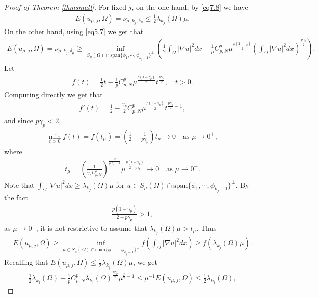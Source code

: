 \documentclass[10pt,a4paper]{amsart}
\newcommand{\ga}{\gamma}
\newcommand{\la}{\lambda}
\begin{document}
\begin{proof}[Proof of Theorem \ref{thmsmall}]
For fixed $j$, on the one hand, by \eqref{eq7.8} we have
\begin{align*}
	E(u_{\mu,j},\Omega) = \nu_{\mu,k_j,\delta_\mu} \le \frac12\la_{k_j}(\Omega) \mu.
\end{align*}
On the other hand, using \eqref{eq5.7} we get that
\begin{align*}
	E(u_{\mu,j},\Omega) = \nu_{\mu,k_j,\delta_\mu} \geq \inf_{S_\mu(\Omega) \cap \text{span}\{\phi_1,\cdots,\phi_{k_j-1}\}^{\bot}}\left( \frac12 \int_\Omega |\nabla u|^2dx - \frac1p C_{p,N}^p \mu^{\frac{p(1-\ga_p)}{2}}\left( \int_\Omega |\nabla u|^2dx\right) ^{\frac{p\ga_p}{2}} \right).
\end{align*}
Let
\begin{align*}
	f(t) = \frac12 t - \frac1p C_{p,N}^p \mu^{\frac{p(1-\ga_p)}{2}}t ^{\frac{p\ga_p}{2}}, \quad t > 0.
\end{align*}
Computing directly we get that
\begin{align*}
	f'(t) = \frac12 - \frac{\ga_p}2 C_{p,N}^p \mu^{\frac{p(1-\ga_p)}{2}}t ^{\frac{p\ga_p}{2}-1},
\end{align*}
and since $p\ga_p < 2$,
\begin{align*}
	\min_{t > 0}f(t) = f(t_\mu) = \left( \frac12 - \frac{1}{p\ga_p}\right) t_\mu \to 0 \quad \text{as } \mu \to 0^+,
\end{align*}
where
\begin{align*}
	t_\mu = \left( \frac{1}{\ga_pC_{p,N}^p}\right) ^{\frac{2}{p\ga_p-2}}\mu^{\frac{p(1-\ga_p)}{2-p\ga_p}} \to 0 \quad \text{as } \mu \to 0^+.
\end{align*}
Note that $\int_\Omega |\nabla u|^2dx \geq \la_{k_j}(\Omega)\mu$ for $u \in S_\mu(\Omega) \cap \text{span}\{\phi_1,\cdots,\phi_{k_j-1}\}^{\bot}$. By the fact
\begin{align*}
	\frac{p(1-\ga_p)}{2-p\ga_p} > 1,
\end{align*}
as $\mu \to 0^+$, it is not restrictive to assume that $\la_{k_j}(\Omega)\mu > t_\mu$. Thus
\begin{align*}
	E(u_{\mu,j},\Omega) \geq \inf_{u \in S_\mu(\Omega) \cap \text{span}\{\phi_1,\cdots,\phi_{k_j-1}\}^{\bot}}f(\int_\Omega |\nabla u|^2dx) \ge f(\la_{k_j}(\Omega)\mu).
\end{align*}
Recalling that $E(u_{\mu,j},\Omega) \le \frac12\la_{k_j}(\Omega) \mu$, we get
\begin{align*}
	\frac12\la_{k_j}(\Omega) - \frac1p C_{p,N}^p \la_{k_j}(\Omega)^{\frac{p\ga_p}{2}} \mu^{\frac{p}{2}-1} \le \mu^{-1}E(u_{\mu,j},\Omega) \le \frac12\la_{k_j}(\Omega),
\end{align*}

\end{proof}
\end{document}
